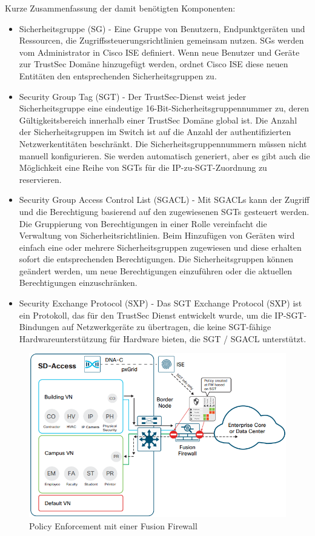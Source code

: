 Kurze Zusammenfassung der damit benötigten Komponenten:
\begin{itemize}
	\item Sicherheitsgruppe (SG) - Eine Gruppe von Benutzern, Endpunktgeräten und Ressourcen, die Zugriffssteuerungsrichtlinien gemeinsam nutzen. SGs werden vom Administrator in Cisco ISE definiert. Wenn neue Benutzer und Geräte zur TrustSec Domäne hinzugefügt werden, ordnet Cisco ISE diese neuen Entitäten den entsprechenden Sicherheitsgruppen zu.
	\item Security Group Tag (SGT) - Der TrustSec-Dienst weist jeder Sicherheitsgruppe eine eindeutige 16-Bit-Sicherheitsgruppennummer zu, deren Gültigkeitsbereich innerhalb einer TrustSec Domäne global ist. Die Anzahl der Sicherheitsgruppen im Switch ist auf die Anzahl der authentifizierten Netzwerkentitäten beschränkt. Die Sicherheitsgruppennummern müssen nicht manuell konfigurieren. Sie werden automatisch generiert, aber es gibt auch die Möglichkeit eine Reihe von SGTs für die IP-zu-SGT-Zuordnung zu reservieren.
	\item Security Group Access Control List (SGACL) - Mit SGACLs kann der Zugriff und die Berechtigung basierend auf den zugewiesenen SGTs gesteuert werden. Die Gruppierung von Berechtigungen in einer Rolle vereinfacht die Verwaltung von Sicherheitsrichtlinien. Beim Hinzufügen von Geräten wird einfach eine oder mehrere Sicherheitsgruppen zugewiesen und diese erhalten sofort die entsprechenden Berechtigungen. Die Sicherheitsgruppen können geändert werden, um neue Berechtigungen einzuführen oder die aktuellen Berechtigungen einzuschränken.
	\item Security Exchange Protocol (SXP) - Das SGT Exchange Protocol (SXP) ist ein Protokoll, das für den TrustSec Dienst entwickelt wurde, um die IP-SGT-Bindungen auf Netzwerkgeräte zu übertragen, die keine SGT-fähige Hardwareunterstützung für Hardware bieten, die SGT / SGACL unterstützt.
\end{itemize}


\begin{figure}[H]
	\centering
	\includegraphics[width=1\linewidth]{img/Absicherung/SGT-FusionFirewall}
	\caption{Policy Enforcement mit einer Fusion Firewall}
	\label{fig:Policy Enforcement mit einer Fusion Firewall}
\end{figure}

